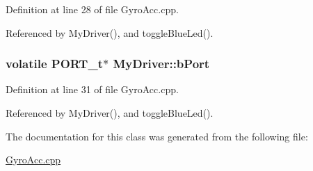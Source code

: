 Definition at line 28 of file GyroAcc.cpp.



Referenced by MyDriver(), and toggleBlueLed().

\hypertarget{class_my_driver_a01b211ba5fc4f33e42a314496546c0cb}{
\subsubsection[{bPort}]{\setlength{\rightskip}{0pt plus 5cm}volatile PORT\_\-t$\ast$ {\bf MyDriver::bPort}}}
\label{class_my_driver_a01b211ba5fc4f33e42a314496546c0cb}


Definition at line 31 of file GyroAcc.cpp.



Referenced by MyDriver(), and toggleBlueLed().



The documentation for this class was generated from the following file:\begin{DoxyCompactItemize}
\item 
\hyperlink{_gyro_acc_8cpp}{GyroAcc.cpp}\end{DoxyCompactItemize}

